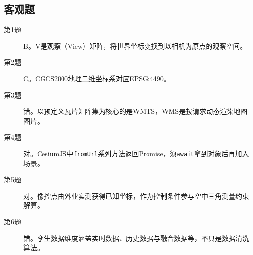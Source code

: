 \subsection*{客观题}
\begin{description}
  \item[第1题] B。V是观察（View）矩阵，将世界坐标变换到以相机为原点的观察空间。
  \item[第2题] C。CGCS2000地理二维坐标系对应EPSG:4490。
  \item[第3题] 错。以预定义瓦片矩阵集为核心的是WMTS，WMS是按请求动态渲染地图图片。
  \item[第4题] 对。CesiumJS中\texttt{fromUrl}系列方法返回Promise，须\texttt{await}拿到对象后再加入场景。
  \item[第5题] 对。像控点由外业实测获得已知坐标，作为控制条件参与空中三角测量约束解算。
  \item[第6题] 错。孪生数据维度涵盖实时数据、历史数据与融合数据等，不只是数据清洗算法。
\end{description}

